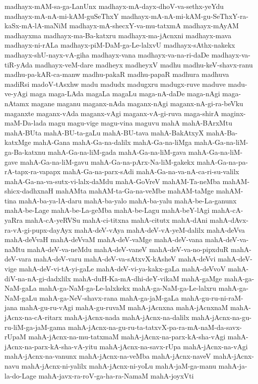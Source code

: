 {madhayx-mAM-sa-ga-LanUnx
madhayx-mA-dayx-dhoV-va-sethx-yeYdu
madhayx-mA-nA-mi-kAM-guSeThxY
madhayx-mA-nA-mi-kAM-gu-SeThxY-ra-kaSx-mA-lA-maNiM
madhayx-mA-shecxY-va-mu-tatxmA
madhayx-mAyAM
madhayxma
madhayx-ma-Ba-katxru
madhayx-ma-jAcnxni
madhayx-mava
madhayx-ni-rALa
madhayx-piM-DaM-ga-Le-lalxvU
madhayx-sAthx-nakekx
madhayx-shU-nayx-vA-giha
madhayx-vana
madhayx-va-na-ri-daDe
madhayx-va-tiR-yAda
madhayx-veM-dare
madheyx
madheyxV
madhu
madhu-keV-shavx-ranu
madhu-pa-kAR-ca-manw
madhu-pakaR
madhu-papaR
madhura
madhuva
madiRsi
madoV-tAsxhw
madu
madudx
madugxru
madugx-ruve
maduve
madu-ve-yAgi
maga
maga-LAda
magaLa
magaLu
maga-nA-daDe
maga-nAgi
maga-nAtamx
magane
maganu
maganx-nAda
maganx-nAgi
maganx-nA-gi-ra-beVku
maganxte
maganx-vAda
maganx-vAgi
maganx-vA-gi-ruva
maga-shirA
maginx-maM-Da-lada
magu
magu-vige
magu-vina
maguvu
mahA
mahA-BArxMtu
mahA-BUta
mahA-BU-ta-gaLu
mahA-BU-tava
mahA-BakAtxyX
mahA-Ba-katxMge
mahA-Gana
mahA-Ga-na-dalilx
mahA-Ga-na-liMga
mahA-Ga-na-liM-ga-Ba-katxnu
mahA-Ga-na-liM-gada
mahA-Ga-na-liM-gava
mahA-Ga-na-liM-gave
mahA-Ga-na-liM-gavu
mahA-Ga-na-pArx-Na-liM-gakekx
mahA-Ga-na-pa-rA-tapx-ra-vapapx
mahA-Ga-na-parx-sAdi
mahA-Ga-na-va-nA-ca-ri-su-valilx
mahA-Ga-na-va-sutx-vi-lalx-daMdu
mahA-GoVreV
mahAM-Ta-neMba
mahAM-shicx-dadhxnaH
mahAMta
mahAM-ta-Ga-na-veMbe
mahAM-taMge
mahAM-tina
mahA-ba-ya-lA-daru
mahA-ba-yalo
mahA-ba-yalu
mahA-be-La-ganunx
mahA-be-Lage
mahA-be-La-geMba
mahA-be-Lagu
mahA-beY-lAgi
mahA-cA-yaRra
mahA-cA-yeRVSu
mahA-ci-titxna
mahA-citutx
mahA-dAni
mahA-dAvx-ra-vA-gi-pupx-dayAyx
mahA-deV-vAya
mahA-deV-vA-yeM-dalilx
mahA-deVva
mahA-deVvaH
mahA-deVvaM
mahA-deV-vaMge
mahA-deV-vana
mahA-deV-va-naMtu
mahA-deV-va-neMdu
mahA-deV-vaneV
mahA-deV-va-no-pipxduR
mahA-deV-vara
mahA-deV-varu
mahA-deV-va-sAtxvX-kAsheV
mahA-deVvi
mahA-deV-vige
mahA-deV-vi-tA-yi-gaLe
mahA-deV-vi-ya-kakx-gaLa
mahA-deVvoV
mahA-diV-na-nA-gi-dadxlilx
mahA-duH-Ka-mA-dhi-deY-vikaM
mahA-gaMge
mahA-ga-NaM-gaLa
mahA-ga-NaM-ga-Le-lalxkekx
mahA-ga-NaM-ga-Le-lalxru
mahA-ga-NaM-gaLu
mahA-ga-NeV-shavx-rana
mahA-ga-jaM-gaLa
mahA-gu-ru-ni-raM-jana
mahA-gu-ru-vAgi
mahA-gu-ruvaM
mahA-jAcnxna
mahA-jAcnxnaM
mahA-jAcnx-na-cA-ritarx
mahA-jAcnx-nada
mahA-jAcnx-na-dalilx
mahA-jAcnx-na-gu-ru-liM-ga-jaM-gama
mahA-jAcnx-na-gu-ru-ta-tatxvX-pa-ra-mA-naM-da-savx-rUpaM
mahA-jAcnx-na-mu-tatxmaM
mahA-jAcnx-na-parx-kA-sha-vAgi
mahA-jAcnx-na-parx-kA-sha-vA-yitu
mahA-jAcnx-na-savx-rUpa
mahA-jAcnx-na-vAgi
mahA-jAcnx-na-vanunx
mahA-jAcnx-na-veMba
mahA-jAcnx-naveV
mahA-jAcnx-navu
mahA-jAcnx-ni-yalilx
mahA-jAcnx-ni-yoLu
mahA-jaM-ga-manu
mahA-ja-la-do-Lage
mahA-javx-ra-roV-ga-ha-ra-NamaM
mahA-joyxVti
}
